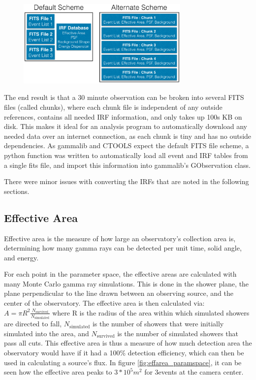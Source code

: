   \begin{figure}[ht]
    \begin{center}
      \includegraphics[width=0.75\textwidth]{images/FITS_diagrams_alternate_scheme.eps}
      \caption[FITS File Event Storage Schemes]{}\label{fig:fits_scheme}
    \end{center}
  \end{figure}

  The end result is that a 30 minute observation can be broken into several FITS files (called chunks), where each chunk file is independent of any outside references, contains all needed IRF information, and only takes up \nicetilde100s KB on disk.
  This makes it ideal for an analysis program to automatically download any needed data over an internet connection, as each chunk is tiny and has no outside dependencies.
  As gammalib and CTOOLS expect the default FITS file scheme, a python function was written to automatically load all event and IRF tables from a single fits file, and import this information into gammalib's GObservation class.

  There were minor issues with converting the IRFs that are noted in the following sections.


  \subsection{Effective Area}\label{subsec:effarea}
    Effective area is the measure of how large an observatory's collection area is, determining how many gamma rays can be detected per unit time, solid angle, and energy.

    For each point in the parameter space, the effective areas are calculated with many Monte Carlo gamma ray simulations.
    This is done in the shower plane, the plane perpendicular to the line drawn between an observing source, and the center of the observatory.
    The effective area is then calculated via:
    $A=\pi R^2 \frac{N_{\text{survived}}}{N_{\text{simulated}}}$
    where R is the radius of the area within which simulated showers are directed to fall, $N_{\text{simulated}}$ is the number of showers that were initially simulated into the area, and $N_{\text{survived}}$ is the number of simulated showers that pass all cuts.
    This effective area is thus a measure of how much detection area the observatory would have if it had a 100\% detection efficiency, which can then be used in calculating a source's flux.
    In figure \ref{fig:effarea_paramspace}, it can be seen how the effective area peaks to \nicetilde$3*10^5 m^2$ for 3\TeV events at the camera center.

